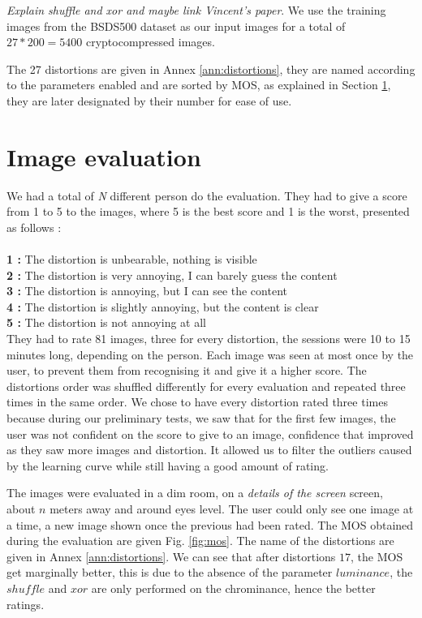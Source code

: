 \documentclass{article}
\begin{document}
\textit{Explain shuffle and xor and maybe link Vincent's paper}. We use the training images from the BSDS500 \cite{bsds500} dataset as our input images for a total of $27 * 200 = 5400$ cryptocompressed images.

The 27 distortions are given in Annex \ref{ann:distortions}, they are named according to the parameters enabled and are sorted by MOS, as explained in Section \ref{sec:evaluation}, they are later designated by their number for ease of use.

\section{Image evaluation}
\label{sec:evaluation}
We had a total of \textit{N} different person do the evaluation. They had to give a score from 1 to 5 to the images, where 5 is the best score and 1 is the worst, presented as follows :\\\\
\textbf{1 :} The distortion is unbearable, nothing is visible\\
\textbf{2 :} \small{The distortion is very annoying, I can barely guess the content}\normalsize{}\\
\textbf{3 :} The distortion is annoying, but I can see the content\\
\textbf{4 :} The distortion is slightly annoying, but the content is clear\\
\textbf{5 :} The distortion is not annoying at all \\

They had to rate 81 images, three for every distortion, the sessions were 10 to 15 minutes long, depending on the person. Each image was seen at most once by the user, to prevent them from recognising it and give it a higher score. The distortions order was shuffled differently for every evaluation and repeated three times in the same order. We chose to have every distortion rated three times because during our preliminary tests, we saw that for the first few images, the user was not confident on the score to give to an image, confidence that improved as they saw more images and distortion. It allowed us to filter the outliers caused by the learning curve while still having a good amount of rating.

The images were evaluated in a dim room, on a \textit{details of the screen} screen, about $n$ meters away and around eyes level. The user could only see one image at a time, a new image shown once the previous had been rated.
The MOS obtained during the evaluation are given Fig. \ref{fig:mos}. The name of the distortions are given in Annex \ref{ann:distortions}. We can see that after distortions $17$, the MOS get marginally better, this is due to the absence of the parameter $luminance$, the $shuffle$ and $xor$ are only performed on the chrominance, hence the better ratings.
\end{document}
